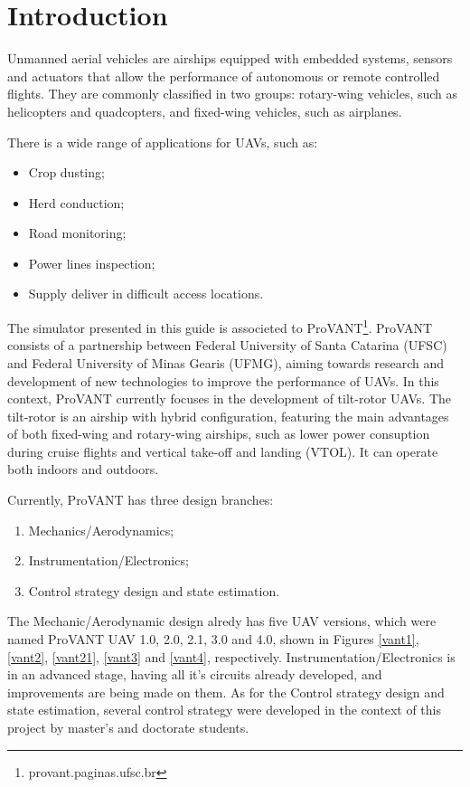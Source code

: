 \chapter{Introduction}

Unmanned aerial vehicles are airships equipped with embedded systems, sensors and actuators that allow the performance of autonomous or remote controlled flights. They are commonly classified in two groups: rotary-wing vehicles, such as helicopters and quadcopters, and fixed-wing vehicles, such as airplanes.

There is a wide range of applications for UAVs, such as:

\begin{itemize}
	\itemsep0em
	\item Crop dusting;
	\item Herd conduction;
	\item Road monitoring;
	\item Power lines inspection;
	\item Supply deliver in difficult access locations.
\end{itemize}

The simulator presented in this guide is associeted to ProVANT\footnote{provant.paginas.ufsc.br}. ProVANT consists of a partnership between Federal University of Santa Catarina (UFSC) and Federal University of Minas Gearis (UFMG), aiming towards research and development of new technologies to improve the performance of UAVs. In this context, ProVANT currently focuses in the development of tilt-rotor UAVs. The tilt-rotor is an airship with hybrid configuration, featuring the main advantages of both fixed-wing and rotary-wing airships, such as lower power consuption during cruise flights and vertical take-off and landing (VTOL). It can operate both indoors and outdoors.

Currently, ProVANT has three design branches:
\begin{enumerate}
	\item Mechanics/Aerodynamics;
	\item Instrumentation/Electronics;
	\item Control strategy design and state estimation.
\end{enumerate}

The Mechanic/Aerodynamic design alredy has five UAV versions, which were named ProVANT UAV 1.0, 2.0, 2.1, 3.0 and 4.0, shown in Figures \ref{vant1}, \ref{vant2}, \ref{vant21}, \ref{vant3} and \ref{vant4}, respectively. Instrumentation/Electronics is in an advanced stage, having all it's circuits already developed, and improvements are being made on them. As for the Control strategy design and state estimation, several control strategy were developed in the context of this project by master's and doctorate students.

